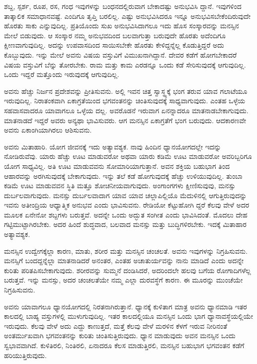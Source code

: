 ಶಬ್ದ, ಸ್ಪರ್ಶ, ರೂಪ, ರಸ, ಗಂಧ ಇವುಗಳನ್ನು ಬಂಧನದಲ್ಲಿರುವಾಗ ಬೇಕಾದಷ್ಟು ಅನುಭವಿಸಿ ದ್ದಾನೆ. ಇವುಗಳಿಂದ ತಾತ್ಕಾಲಿಕ ಸಮಾಧಾನವಷ್ಟೆ. ಎಂದಿಗೂ ತೃಪ್ತಿ ಬರಲಿಲ್ಲ. ಎಷ್ಟು ಅನುಭವಿಸಿದರೂ ಇನ್ನೂ ಅನುಭವಿಸಬೇಕೆಂದಿರುವುದೇ ಹೊರತು ಸಾಕು ಎನ್ನುವುದಿಲ್ಲ. ಪ್ರತಿ\-ಯೊಂದು ಸುಖ ಅನುಭವಿಸಿದಾಗಲೂ ಇದು ಹೊಸ ಸಂಸ್ಕಾರವನ್ನು ಮನಸ್ಸಿನ ಮೇಲೆ ಬಿಡುವುದು. ಆ ಸಂಸ್ಕಾರ ನಮ್ಮ ಅನುಭವದಿಂದ ಬಲವಾಗುತ್ತಾ ಬರುವುದೇ ಹೊರತು ಅದೆಂದಿಗೂ ಕ್ಷೀಣವಾಗುವುದಿಲ್ಲ. ಅದನ್ನು ಉಪವಾಸದಿಂದ ಸಾಯಿಸಬೇಕೇ ಹೊರತು ಕೇಳಿದ್ದನ್ನೆಲ್ಲ ಕೊಡುತ್ತಿದ್ದರೆ ಅದು ಕೊಬ್ಬುವುದು. ಇನ್ನು ಮೇಲೆ ಅವನು ವಿಷಯ ವಸ್ತುವಿಗೆ ವಿಮುಖನಾಗಿದ್ದಾನೆ. ದೇವರ ಕಡೆಗೆ ಹೋಗಬೇಕಾದರೆ ವಿಷಯ ವಸ್ತುವಿಗೆ ಬೆನ್ನು ತೋರಬೇಕು. ರಾಮ ಮತ್ತು ಕಾಮ ಎರಡನ್ನೂ ಒಂದು ಕಡೆ ಸೇರಿಸುವುದಕ್ಕೆ ಆಗುವುದಿಲ್ಲ. ಒಂದು ಇದ್ದರೆ ಮತ್ತೊಂದು ಇರುವುದಕ್ಕೆ ಆಗುವುದಿಲ್ಲ.

ಅವನು ಹೆಚ್ಚು ನಿರ್ಜನ ಪ್ರದೇಶವನ್ನು ಪ್ರೀತಿಸುವನು. ಅಲ್ಲಿ ಇವನ ಚಿತ್ತ ಸ್ವಾಸ್ಥ್ಯಕ್ಕೆ ಭಂಗ ತರುವ ಯಾವ ಗಲಾಟೆಯೂ ಇರುವುದಿಲ್ಲ. ನಿರಾತಂಕವಾಗಿ ಏಕಾಗ್ರತೆಯಿಂದ ಭಗವಂತನನ್ನು ಚಿಂತಿಸುವುದಕ್ಕೆ ಸಾಧ್ಯವಾಗುವುದು. ಎಂತಹ ಒಳ್ಳೆಯ ಸಹವಾಸವಾದರೂ ಯಾವಾಗಲೂ ಒಳ್ಳೆಯ ದಲ್ಲ. ಅವರೊಡನೆ ಇರುವಾಗ ಏನನ್ನಾದರೂ ಮಾತನಾಡಬೇಕಾಗುವುದು. ಮಾತನಾಡದೆ ಇದ್ದರೆ ಅವರು ಅನ್ಯಥಾ ಭಾವಿಸುವರು. ಆಗ ಮನಸ್ಸಿನ ಏಕಾಗ್ರತೆಗೆ ಭಂಗ ಬರುವುದು. ಆದಕಾರಣವೇ ಅವನು ಏಕಾಂಗಿಯಾಗಿರಲು ಆಶಿಸುವನು.

ಅವನು ಮಿತಾಹಾರಿ. ಯೋಗ ಜೀವನಕ್ಕೆ ಇದು ಅತ್ಯಾವಶ್ಯಕ. ನಾವು ಹಿಂದಿನ ಧ್ಯಾನಯೋಗದಲ್ಲೇ ಇದನ್ನು ನೋಡಿರುವೆವು. ಯಾರು ಹೆಚ್ಚು ಊಟ ಮಾಡುವರೋ ಅಥವಾ ಯಾರು ಕಡಿಮೆ ಊಟ ಮಾಡುವರೋ ಅವರಿಬ್ಬರಿಗೂ ಯೋಗ ಸಾಧ್ಯವಿಲ್ಲ. ಅತಿ ಊಟ ಮಾಡುವವನು ಸೋಮಾರಿಯಾಗುತ್ತಾನೆ. ಅವನ ಶಕ್ತಿಯ ಬಹುಭಾಗ ತಿಂದ ಆಹಾರವನ್ನು ಅರಗಿಸುವುದಕ್ಕೆ ಬೇಕಾಗುವುದು. ಇನ್ನು ತಲೆ ಕಡೆ ಹೋಗುವುದಕ್ಕೆ ಹೆಚ್ಚು ಉಳಿಯುವುದಿಲ್ಲ. ತುಂಬಾ ಕಡಿಮೆ ಊಟ ಮಾಡುವವನ ಸ್ಥಿತಿ ಮತ್ತೂ ಶೋಚನೀಯವಾಗುವುದು. ಅಂಗಾಂಗಗಳು ಕ್ಷೀಣಿಸುವುವು, ಮನಸ್ಸು ದುರ್ಬಲವಾಗುವುದು. ಮನಸ್ಸು ದುರ್ಬಲವಾದಾಗ ಯಾವ ಯಾವ ಚಲ್ಲಾಪಿಲ್ಲಿಯೊ ಮೆದುಳಿನಲ್ಲಿ ಆಗುತ್ತಿರುವುದನ್ನು ಇವನು ಅತೀಂದ್ರಿಯ ಆಧ್ಯಾತ್ಮಿಕ ಅನುಭವ ಎಂದು ಭಾವಿಸು\-ವನು. ರೇಡಿಯೋ ಕೆಟ್ಟುಹೋಗಿ ದ್ದರೆ ಕೆಲವು ವೇಳೆ ಅದರ ಮೂಲಕ ಏನೇನೋ ಶಬ್ದಗಳು ಬರುತ್ತವೆ. ಅದನ್ನೇ ಒಂದು ಅದ್ಭುತ ಸಂಗೀತ ಎಂದು ಭಾವಿಸಿದಂತೆ. ಮೊದಲು ದೇಹ ಗಟ್ಟಿಮುಟ್ಟಾಗಿರಬೇಕು. ಅದರ ಹಿಂದೆ ಶುದ್ಧವಾದ, ಬಲವಾದ ಮನಸ್ಸು ಮತ್ತು ಬುದ್ಧಿಗಳಿರಬೇಕು. ಇದಕ್ಕೆ ಮಿತಾಹಾರ ಅತ್ಯಾವಶ್ಯಕ.

ಮನಸ್ಸಿನ ಉದ್ವೇಗಕ್ಕೆಲ್ಲಾ ಕಾರಣ, ಮಾತು, ಶರೀರ ಮತ್ತು ಮನಸ್ಸಿನ ಚಂಚಲತೆ. ಅವನು ಇವುಗಳನ್ನು ನಿಗ್ರಹಿಸುವನು. ಮನಸ್ಸಿಗೆ ಬಂದದ್ದನ್ನೆಲ್ಲಾ ಮಾತನಾಡಿದರೆ ಅನಂತರ, ಎಂತಹ ಅಚಾತುರ್ಯವನ್ನು ನಾನು ಮಾಡಿದೆ ಎಂದು ಅದನ್ನೇ ಕುರಿತು ಪರಿತಪಿಸಬೇಕಾಗುವುದು. ಶರೀರವನ್ನು ಸುಮ್ಮನೆ ದಂಡಿಸಿದರೆ, ಅದರಿಂದಲೇ ಹಲವು ಬಗೆಯ ರೋಗಾದಿಗಳೆಲ್ಲ ಬರುತ್ತವೆ. ಇನ್ನು ಮನಸ್ಸು, ಅದರ ಚಂಚಲತೆಯೇ ನಮ್ಮ ಎಲ್ಲಾ ದುರವಸ್ಥೆಗೆ ಕಾರಣ. ಈ ಮೂರನ್ನು ಮುಂಚೆಯೇ ನಿಗ್ರಹಿಸುವನು.

ಅವನು ಯಾವಾಗಲೂ ಧ್ಯಾನಯೋಗದಲ್ಲಿ ನಿರತನಾಗಿರುತ್ತಾನೆ. ಧ್ಯಾನಕ್ಕೆ ಕುಳಿತಾಗ ಮಾತ್ರ ಅವನು ಧ್ಯಾನಮಾಡಿ ಇತರ ಕಾಲದಲ್ಲಿ ಬಾಹ್ಯ ವಸ್ತುಗಳಲ್ಲಿ ಮುಳುಗುವುದಿಲ್ಲ. ಇತರ ಕಾಲ\-ದಲ್ಲಿಯೂ ಮನಸ್ಸಿನ ಒಂದು ಭಾಗ ಧ್ಯಾನಾವಸ್ಥೆಯಲ್ಲಿಯೇ ಇರುವುದು. ಕೆಲವು ವೇಳೆ ಅದು ಎದ್ದು ಕಾಣುತ್ತದೆ, ಮತ್ತೆ ಕೆಲವು ವೇಳೆ ಮರಳಿನ ಕೆಳಗೆ ಇರುವ ನೀರಿನಂತೆ ಅಂತರ್ಮುಖವಾಗಿ ಭಗವಂತನನ್ನು ಕುರಿತು ಚಿಂತಿಸುತ್ತಿರುವುದು. ಧ್ಯಾನ ಮಾಡುವುದು ಅವನ ಮನಸ್ಸಿನ ಒಂದು ಸ್ವಭಾವವಾಗಿದೆ. ಕುಳಿತಿರಲಿ, ನಿಂತಿರಲಿ, ಏನಾದರೂ ಕೆಲಸ ಮಾಡುತ್ತಿರಲಿ, ಮನಸ್ಸಿನ ಬಹುಭಾಗ ಭಗವಂತನ ಕಡೆಗೆ ಹರಿಯುತ್ತಿರುವುದು.

